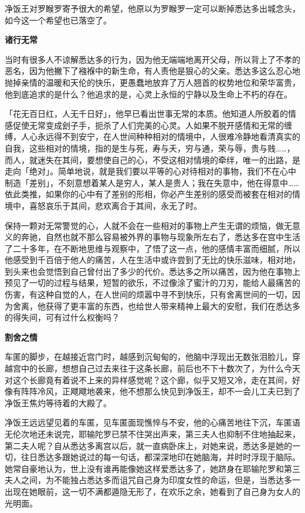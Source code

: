 \documentclass[12pt,twoside,openany]{book}
\newcommand{\mt}[1]{\textbullet \textbf{#1}}
\begin{document}
净饭王对罗睺罗寄予很大的希望，他原以为罗睺罗一定可以断掉悉达多出城念头，如今这一个希望也已落空了。

\mt{诸行无常}

当时有很多人不谅解悉达多的行为，因为他无端端地离开父母，所以背上了不孝的恶名，因为他撇下了襁褓中的新生命，有人责他是狠心的父亲。悉达多这么忍心地抛掉亲情的温暖和天伦的快乐，更愚蠢地放弃了万人翘首的权势地位和荣华富贵，他到底追求的是什么？他追求的是，心灵上永恒的宁静以及生命上不朽的存在。

「花无百日红，人无千日好」，他早已看出世事无常的本质。他知道人所胶着的情感促使无常变成刽子手，扼杀了人们完美的心灵。人如果不脱开感情和无常的缠缚，人心永远得不到安宁，在人世间种种相对的情境中，人很难冷静地看清真实的自我，这些相对的情境，指的是生与死，寿与夭，穷与通，荣与辱，贵与贱……，而人，就迷失在其间，要想使自己的心，不受这相对情境的牵绊，唯一的出路，是走向「绝对」。简单地说，就是我们要以平等的心对待相对的事物，我们不在心中制造「差别」，不刻意想着某人是穷人，某人是贵人；我在失意中，他在得意中……依此类推，如果你的心中有了差别的形相，你必产生差别的感受而被套在相对的情境中，喜怒哀乐于其间，悲欢离合于其间，永无了时。

保持一颗对无常警觉的心，人就不会在一些相对的事物上产生无谓的烦恼，做无意义的奔驰，自然也就不那么容易被外界的事物与现象所左右了，悉达多在宫中生活了二十多年，在不断地思维与观察中，了悟了这一点，他的感情丰富而细腻，所以他感受到千百倍于他人的痛苦，人在生活中或许尝到了无比的快乐滋味，相对地，到头来也会觉悟到自己曾付出了多少的代价。悉达多之所以痛苦，因为他在事物上预见了一切的过程与结果，短暂的欲乐，不过像涂了蜜汁的刀刃，能给人最痛苦的伤害，有这种自觉的人，在人世间的烦嚣中寻不到快乐，只有舍离世间的一切，因为舍离，他获得了更丰富的东西，也给世人带来精神上最大的安慰，我们在悉达多的得失间，可有过什么权衡吗？

\mt{割舍之情}

车匿的脚步，在越接近宫门时，越感到沉甸甸的，他脑中浮现出无数张泪脸儿，穿越宫中的长廊，想想自己过去来往于这条长廊，前后也不下十数次了，为什么今天对这个长廊竟有着说不上来的异样感觉呢？这个廊，似乎又短又冷，走在其间，好像有阵阵冷风，正飕飕地袭来，他不想那么快见到净饭王，却不一会儿工夫已到了净饭王焦灼等待着的大殿了。

净饭王远远望见着的车匿，见车匿面现憔悴与不安，他的心痛苦地往下沉，车匿语无伦次地还未说完，耶输陀罗已禁不住哭出声来，第三夫人也抑制不住地抽起来，第二夫人呢？自从悉达多离宫以后，就一直病卧床上，对她来说，悉达多是她的一切，往日悉达多跟她说过的每一句话，都深深地印在她脑海，并时时浮现于脑际。她常自豪地认为，世上没有谁再能像她这样爱悉达多了，她跻身在耶输陀罗和第三夫人之间，为不能独占悉达多而诅咒自己身为印度女性的命运，但是，当悉达多一出现在她眼前，这一切不满都遁隐无形了，在欢乐之余，她看到了自己身为女人的光明面。
\end{document}
